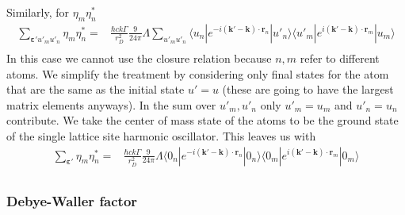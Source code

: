 \documentclass[11pt,letter]{article}
\newcommand{\bv}[1]{\ensuremath{\bm{#1}}}
\begin{document}
Similarly, for $\eta_{m}\eta_{n}^{*}$
\begin{equation}
\begin{split}
 \sum_{\bv{\varepsilon}' u'_{m} u'_{n}} \eta_{m}\eta_{n}^{*} = & 
    \frac{\hbar c k \Gamma}{r_{D}^{2}}  
    \frac{9}{24\pi} \Lambda
 \sum_{u'_{m} u'_{n}} 
      \langle u_{n} | e^{-i(\bv{k}'-\bv{k}) \cdot\bv{r}_{n}} | u'_{n}  \rangle
      \langle u'_{m} | e^{i(\bv{k}'-\bv{k}) \cdot\bv{r}_{m}} | u_{m}  \rangle \\
\end{split}
\end{equation}
In this case we cannot use the closure relation because $n,m$ refer to
different atoms.   We simplify the treatment by considering only final states
for the atom that are the same as the initial state $u'=u$ (these are going to
have the largest matrix elements anyways). In the sum over $u'_{m},u'_{n}$ only
$u'_{m}=u_{m}$ and $u'_{n}=u_{n}$ contribute.  We take the center of mass state
of the atoms to be the ground state of the single lattice site harmonic
oscillator.  This leaves us with 
\begin{equation}
\begin{split}
 \sum_{\bv{\varepsilon}' } \eta_{m}\eta_{n}^{*} = & 
  \frac{\hbar c k \Gamma}{r_{D}^{2}}  
    \frac{9}{24\pi} \Lambda
      \langle 0_{n} | e^{-i(\bv{k}'-\bv{k}) \cdot\bv{r}_{n}} | 0_{n}  \rangle
      \langle 0_{m} | e^{i(\bv{k}'-\bv{k}) \cdot\bv{r}_{m}} | 0_{m}  \rangle \\
\end{split}
\end{equation}

\subsubsection{Debye-Waller factor} 
\end{document}
